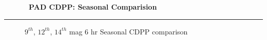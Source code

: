 \cleardoublepage
\begin{figure*}[h!]
  \centering
  \hfill
  {\Huge {\bf \quarter\ PAD CDPP: Seasonal Comparision }}
  \hfill
\end{figure*}
\hrule
\begin{figure*}[h!]
  \centering
  \hfill
  \caption{$9^{th}$, $12^{th}$, $14^{th}$ mag 6 hr Seasonal CDPP comparison}
\end{figure*}


